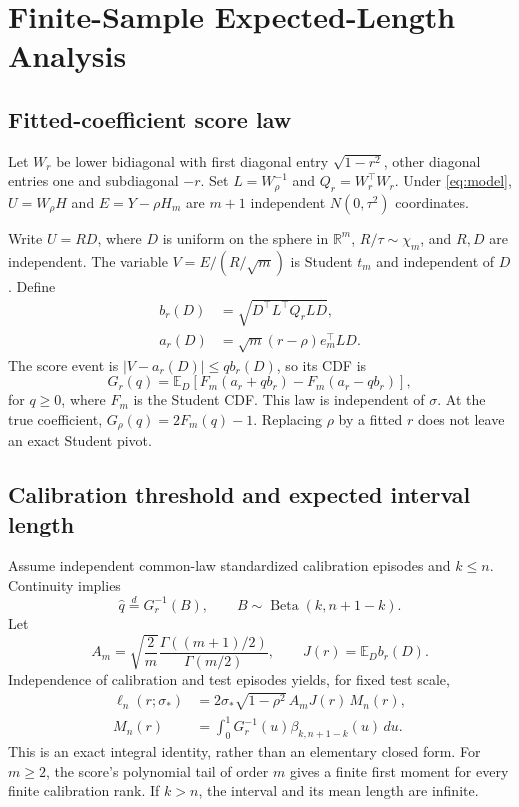 \documentclass[nolineno]{ieeeaccess}
\newcommand{\E}{\mathbb{E}}
\newcommand{\R}{\mathbb{R}}
\begin{document}
\section{Finite-Sample Expected-Length Analysis}
\subsection{Fitted-coefficient score law}
Let $W_r$ be lower bidiagonal with first diagonal entry $\sqrt{1-r^2}$, other diagonal entries one and subdiagonal $-r$. Set $L=W_\rho^{-1}$ and $Q_r=W_r^\top W_r$. Under \eqref{eq:model},
$U=W_\rho H$ and $E=Y-\rho H_m$ are $m+1$ independent $N(0,\tau^2)$ coordinates.

Write $U=RD$, where $D$ is uniform on the sphere in $\R^m$, $R/\tau\sim\chi_m$, and $R,D$ are independent. The variable $V=E/(R/\sqrt m)$ is Student $t_m$ and independent of $D$. Define
\begin{align}
b_r(D)&=\sqrt{D^\top L^\top Q_rLD},\nonumber\\
a_r(D)&=\sqrt m(r-\rho)e_m^\top LD.\label{eq:ab}
\end{align}
The score event is $|V-a_r(D)|\leq q b_r(D)$, so its CDF is
\begin{equation}
G_r(q)=\E_D\!\left[F_m(a_r+qb_r)-F_m(a_r-qb_r)\right],
\label{eq:cdf}
\end{equation}
for $q\geq0$, where $F_m$ is the Student CDF. This law is independent of $\sigma$. At the true coefficient, $G_\rho(q)=2F_m(q)-1$. Replacing $\rho$ by a fitted $r$ does not leave an exact Student pivot.

\subsection{Calibration threshold and expected interval length}
Assume independent common-law standardized calibration episodes and $k\leq n$. Continuity implies
\begin{equation}
\widehat q\overset{d}{=}G_r^{-1}(B),\qquad B\sim\operatorname{Beta}(k,n+1-k).
\label{eq:beta}
\end{equation}
Let
\begin{equation}
A_m=\sqrt{\frac{2}{m}}\frac{\Gamma((m+1)/2)}{\Gamma(m/2)},
\qquad J(r)=\E_D b_r(D).
\end{equation}
Independence of calibration and test episodes yields, for fixed test scale,
\begin{align}
\ell_n(r;\sigma_*)&=2\sigma_*\sqrt{1-\rho^2}\,A_mJ(r)\,M_n(r),\nonumber\\
M_n(r)&=\int_0^1 G_r^{-1}(u)\beta_{k,n+1-k}(u)\,du.
\label{eq:condmean}
\end{align}
This is an exact integral identity, rather than an elementary closed form. For $m\geq2$, the score's polynomial tail of order $m$ gives a finite first moment for every finite calibration rank. If $k>n$, the interval and its mean length are infinite.
\end{document}
